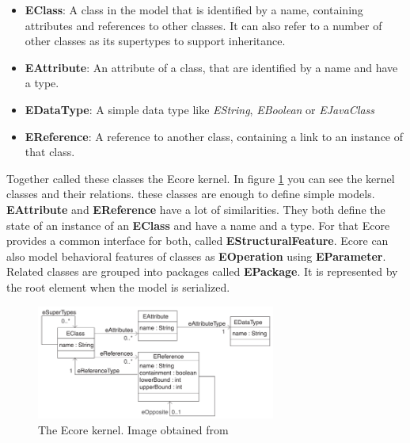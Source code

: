 \documentclass[conference,onecolumn]{IEEEtran}
\begin{document}
    \begin{itemize}
      \item \textbf{EClass}: A class in the model that is identified by a name, containing attributes and references to other classes. It can also refer to a number of other classes as its supertypes to support inheritance.\cite{emf}
      \item \textbf{EAttribute}: An attribute of a class, that are identified by a name and have a type.\cite{emf}
      \item \textbf{EDataType}: A simple data type like \textit{EString}, \textit{EBoolean} or \textit{EJavaClass}\cite{emf}
      \item \textbf{EReference}: A reference to another class, containing a link to an instance of that class.\cite{emf}
    \end{itemize}


    Together \citeauthor{emf} called these classes the Ecore kernel. In figure \ref{fig:emf-kernel} you can see the kernel classes and their relations. these classes are enough to define simple models. \textbf{EAttribute} and \textbf{EReference} have a lot of similarities. They both define the state of an instance of an \textbf{EClass} and have a name and a type. For that Ecore provides a common interface for both, called \textbf{EStructuralFeature}. Ecore can also model behavioral features of classes as \textbf{EOperation} using \textbf{EParameter}.
    Related classes are grouped into packages called \textbf{EPackage}. It is represented by the root element when the model is serialized. \cite{emf}

    \begin{figure}[h]
      \centering
      \includegraphics[width=0.7\textwidth]{emf-kernel}
      \caption{The Ecore kernel. Image obtained from \cite{emf}}
      \label{fig:emf-kernel}
    \end{figure}
\end{document}
